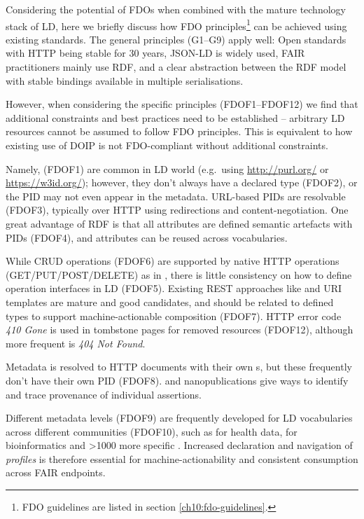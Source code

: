Considering the potential of FDOs when combined with the mature
technology stack of LD, here we briefly discuss how 
FDO principles\footnote{
FDO guidelines are listed in section \vref{ch10:fdo-guidelines}.
} can
be achieved using existing standards. The general principles (G1--G9)
apply well: Open standards with HTTP being stable for 30 years, \acrshort{JSON-LD}
is widely used, FAIR practitioners mainly use \acrshort{RDF}, and a clear
abstraction between the RDF model with stable bindings available in
multiple serialisations.

However, when considering the specific principles (FDOF1--FDOF12) we
find that additional constraints and best practices need to be
established -- arbitrary LD resources cannot be assumed to follow FDO
principles. This is equivalent to how existing use of \acrshort{DOIP} is not
FDO-compliant without additional constraints.

Namely, 
\cite{McMurry 2017}
(FDOF1) are common in \acrshort{LD} world (e.g.~using \url{http://purl.org/} or
\url{https://w3id.org/}); however, they don't always have a declared type
(FDOF2), or the PID may not even appear in the metadata. URL-based PIDs
are resolvable (FDOF3), typically over \acrshort{HTTP} using redirections and
content-negotiation. One great advantage of \acrshort{RDF} is that all attributes
are defined semantic artefacts with PIDs (FDOF4), and attributes can be
reused across vocabularies.

While \gls{CRUD} operations (FDOF6) are supported by native HTTP operations
(GET/PUT/POST/DELETE) as in ,
there is little consistency on how to define operation interfaces in LD
(FDOF5). Existing \acrshort{REST} approaches like
 \cite{Miller 2021} and
URI templates \cite{Gregorio 2012} are mature and
good candidates, and should be related to defined types to support
machine-actionable composition (FDOF7). HTTP error code \emph{410 Gone}
is used in tombstone pages for removed resources (FDOF12), although more
frequent is \emph{404 Not Found}.

Metadata is resolved to HTTP documents with their own s, but these
frequently don't have their own PID (FDOF8).
 and nanopublications
\cite{Kuhn 2021} give ways
to identify and trace provenance of individual assertions.

Different metadata levels (FDOF9) are frequently developed for LD
vocabularies across different communities (FDOF10), such as
 for health data,
 for bioinformatics and
\textgreater1000 more specific
.
Increased declaration and navigation of \emph{profiles} is therefore
essential for machine-actionability and consistent consumption across
FAIR endpoints.

